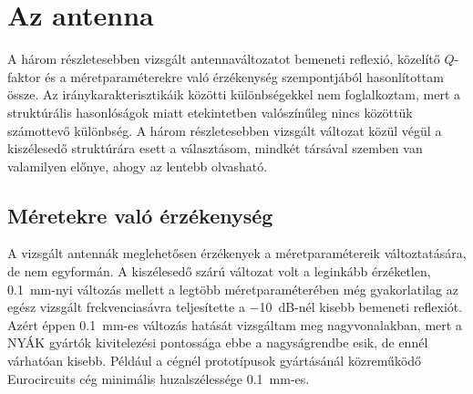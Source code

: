 \section{Az antenna}
A három részletesebben vizsgált antennaváltozatot bemeneti reflexió, közelítő $Q$-faktor és a méretparaméterekre való érzékenység szempontjából hasonlítottam össze. Az iránykarakterisztikáik közötti különbségekkel nem foglalkoztam, mert a struktúrális hasonlóságok miatt etekintetben valószínűleg nincs közöttük számottevő különbség. A három részletesebben vizsgált változat közül végül a kiszélesedő struktúrára esett a választásom, mindkét társával szemben van valamilyen előnye, ahogy az lentebb olvasható.
\subsection{Méretekre való érzékenység}
A vizsgált antennák meglehetősen érzékenyek a méretparamétereik változtatására, de nem egyformán. A kiszélesedő szárú változat volt a leginkább érzéketlen, \SI{0,1}{mm}-nyi változás mellett a legtöbb méretparaméterében még gyakorlatilag az egész vizsgált frekvenciasávra teljesítette a \SI{-10}{dB}-nél kisebb bemeneti reflexiót. Azért éppen \SI{0,1}{mm}-es változás hatását vizsgáltam meg nagyvonalakban, mert a NYÁK gyártók kivitelezési pontossága ebbe a nagyságrendbe esik, de ennél várhatóan kisebb. Például a cégnél prototípusok gyártásánál közreműködő Eurocircuits \cite{eurocircuits} cég minimális huzalszélessége \SI{0,1}{mm}-es.
